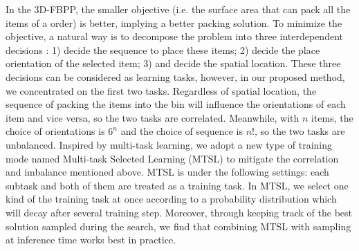 In the 3D-FBPP, the smaller objective (i.e. the surface area that can pack all the items of a order) is better, implying a better packing solution. To minimize the objective, a natural way is to decompose the problem into three interdependent decisions \cite{gonccalves2013biased,li2014genetic}: 1) decide the sequence to place these items; 2) decide the place orientation of the selected item; 3) and decide the spatial location. These three decisions can be considered as learning tasks, however, in our proposed method, we concentrated on the first two tasks. Regardless of spatial location, the sequence of packing the items into the bin will influence the orientations of each item and vice versa, so the two tasks are correlated. Meanwhile, with $n$ items, the choice of orientations is $6^n$ and the choice of sequence is $n!$, so the two tasks are unbalanced. Inspired by multi-task learning, %
we adopt a new type of training mode named 
Multi-task Selected Learning (MTSL) to mitigate the correlation and imbalance mentioned above. MTSL is under the following settings: each subtask and both of them are treated as a training task. In MTSL, we select one kind of the training task at once according to a probability distribution which will decay after several training step. Moreover, through keeping track of the best solution sampled during the search, we find that combining MTSL with sampling at inference time works best in practice.

